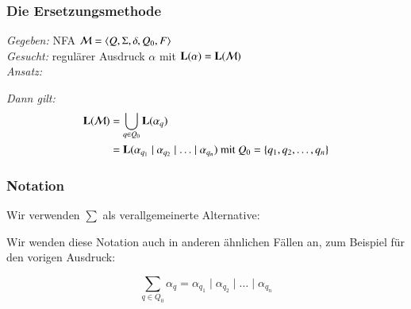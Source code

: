 \documentclass[aspectratio=1610,onlymath]{beamer}
\begin{document}
\begin{frame}\frametitle{Die Ersetzungsmethode}

\emph{Gegeben:} NFA  $\mathcal{M}=\langle{Q,\Sigma,\delta,Q_0,F}\rangle$\\[1ex]
\emph{Gesucht:} regulärer Ausdruck $\alpha$ mit $\textbf{\textcolor{black}{L}}(\alpha)=\textbf{\textcolor{black}{L}}(\mathcal{M})$\\[1ex]

\emph{Ansatz:}


\emph{Dann gilt:}
\begin{align*}
\textbf{\textcolor{black}{L}}(\mathcal{M}) &=\bigcup_{q\in Q_0} \textbf{\textcolor{black}{L}}(\alpha_q) \\
	&=  \textbf{\textcolor{black}{L}}(\alpha_{q_1}\mid\alpha_{q_2}\mid\ldots\mid \alpha_{q_n})\text{ mit }Q_0=\{q_1,q_2,\ldots,q_n\}
\end{align*}

\end{frame}

\begin{frame}\frametitle{Notation}

Wir verwenden $\sum$ als verallgemeinerte Alternative:\medskip

\bigskip

Wir wenden diese Notation auch in anderen ähnlichen Fällen an, zum Beispiel für den vorigen Ausdruck:

\[\sum_{q\in Q_0} \alpha_q = \alpha_{q_1}\mid\alpha_{q_2}\mid\ldots\mid \alpha_{q_n}\]

\end{frame}
\end{document}
